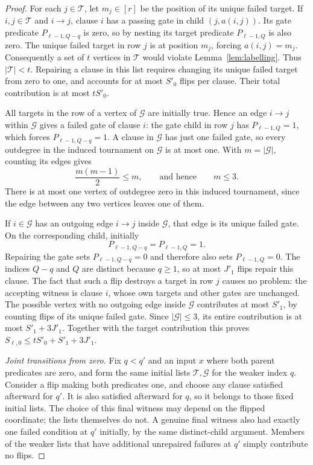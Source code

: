 \documentclass[11pt]{article}
\theoremstyle{definition}
\theoremstyle{remark}
\begin{document}
\begin{proof}
For each $j\in\mathcal T$, let $m_j\in[r]$ be the position of its
unique failed target.  If $i,j\in\mathcal T$ and $i\to j$, clause
$i$ has a passing gate in child $(j,a(i,j))$.  Its gate predicate
$P_{\ell-1,Q-q}$ is zero, so by nesting its target predicate
$P_{\ell-1,Q}$ is also zero.  The unique failed target in row $j$
is at position $m_j$, forcing $a(i,j)=m_j$.  Consequently a set of
$t$ vertices in $\mathcal T$ would violate Lemma~\ref{lem:labelling}.
Thus $|\mathcal T|<t$.  Repairing a clause in this list requires
changing its unique failed target from zero to one, and accounts for
at most $S'_0$ flips per clause.  Their total contribution is at most
$tS'_0$.

All targets in the row of a vertex of $\mathcal G$ are initially
true.  Hence an edge $i\to j$ within $\mathcal G$ gives a failed
gate of clause $i$: the gate child in row $j$ has
$P_{\ell-1,Q}=1$, which forces $P_{\ell-1,Q-q}=1$.  A clause in
$\mathcal G$ has just one failed gate, so every outdegree in the
induced tournament on $\mathcal G$ is at most one.  With
$m=|\mathcal G|$, counting its edges gives
\[
 \frac{m(m-1)}2\leq m,
 \qquad\text{and hence}\qquad m\leq3.
\]
There is at most one vertex of outdegree zero in this induced
tournament, since the edge between any two vertices leaves one of
them.

If $i\in\mathcal G$ has an outgoing edge $i\to j$ inside
$\mathcal G$, that edge is its unique failed gate.  On the
corresponding child, initially
\[
 P_{\ell-1,Q-q}=P_{\ell-1,Q}=1.
\]
Repairing the gate sets $P_{\ell-1,Q-q}=0$ and therefore also sets
$P_{\ell-1,Q}=0$.  The indices $Q-q$ and $Q$ are distinct because
$q\geq1$, so at most $J'_1$ flips repair this clause.  The fact that
such a flip destroys a target in row $j$ causes no problem: the
accepting witness is clause $i$, whose own targets and other gates
are unchanged.  The possible vertex with no outgoing edge inside
$\mathcal G$ contributes at most $S'_1$, by counting flips of its
unique failed gate.  Since $|\mathcal G|\leq3$, its entire
contribution is at most $S'_1+3J'_1$.  Together with the target
contribution this proves
$S_{\ell,0}\leq tS'_0+S'_1+3J'_1$.

\emph{Joint transitions from zero.}
Fix $q<q'$ and an input $x$ where both parent predicates are zero,
and form the same initial lists $\mathcal T,\mathcal G$ for the
weaker index $q$.  Consider a flip making both predicates one, and
choose any clause satisfied afterward for $q'$.  It is also satisfied
afterward for $q$, so it belongs to those fixed initial lists.  The
choice of this final witness may depend on the flipped coordinate;
the lists themselves do not.  A genuine final witness also had
exactly one failed condition at $q'$ initially, by the same
distinct-child argument.  Members of the weaker lists that have
additional unrepaired failures at $q'$ simply contribute no flips.


\end{proof}
\end{document}
